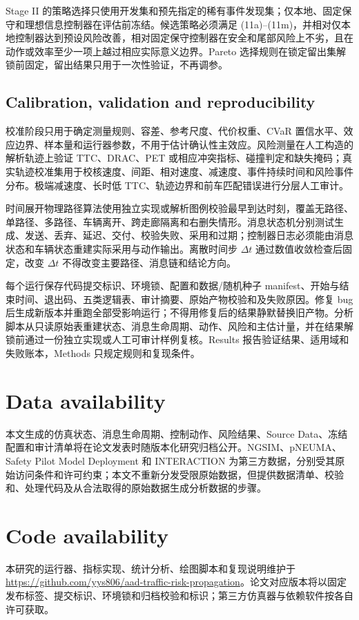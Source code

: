 \documentclass[10pt,a4paper,twocolumn]{article}
\begin{document}
Stage II 的策略选择只使用开发集和预先指定的稀有事件发现集；仅本地、固定保守和理想信息控制器在评估前冻结。候选策略必须满足 (11a)--(11m)，并相对仅本地控制器达到预设风险改善，相对固定保守控制器在安全和尾部风险上不劣，且在动作或效率至少一项上越过相应实际意义边界。Pareto 选择规则在锁定留出集解锁前固定，留出结果只用于一次性验证，不再调参。

\subsection*{Calibration, validation and reproducibility}
校准阶段只用于确定测量规则、容差、参考尺度、代价权重、CVaR 置信水平、效应边界、样本量和运行器参数，不用于估计确认性主效应。风险测量在人工构造的解析轨迹上验证 TTC、DRAC、PET 或相应冲突指标、碰撞判定和缺失掩码；真实轨迹校准集用于校核速度、间距、相对速度、减速度、事件持续时间和风险事件分布。极端减速度、长时低 TTC、轨迹边界和前车匹配错误进行分层人工审计。

时间展开物理路径算法使用独立实现或解析图例校验最早到达时刻，覆盖无路径、单路径、多路径、车辆离开、跨走廊隔离和右删失情形。消息状态机分别测试生成、发送、丢弃、延迟、交付、校验失败、采用和过期；控制器日志必须能由消息状态和车辆状态重建实际采用与动作输出。离散时间步 $\Delta t$ 通过数值收敛检查后固定，改变 $\Delta t$ 不得改变主要路径、消息链和结论方向。

每个运行保存代码提交标识、环境锁、配置和数据/随机种子 manifest、开始与结束时间、退出码、五类逻辑表、审计摘要、原始产物校验和及失败原因。修复 bug 后生成新版本并重跑全部受影响运行；不得用修复后的结果静默替换旧产物。分析脚本从只读原始表重建状态、消息生命周期、动作、风险和主估计量，并在结果解锁前通过一份独立实现或人工可审计样例复核。Results 报告验证结果、适用域和失败账本，Methods 只规定规则和复现条件。

\section*{Data availability}
本文生成的仿真状态、消息生命周期、控制动作、风险结果、Source Data、冻结配置和审计清单将在论文发表时随版本化研究归档公开。NGSIM、pNEUMA、Safety Pilot Model Deployment 和 INTERACTION 为第三方数据，分别受其原始访问条件和许可约束；本文不重新分发受限原始数据，但提供数据清单、校验和、处理代码及从合法取得的原始数据生成分析数据的步骤。

\section*{Code availability}
本研究的运行器、指标实现、统计分析、绘图脚本和复现说明维护于 \url{https://github.com/yys806/aad-traffic-risk-propagation}。论文对应版本将以固定发布标签、提交标识、环境锁和归档校验和标识；第三方仿真器与依赖软件按各自许可获取。
\end{document}

